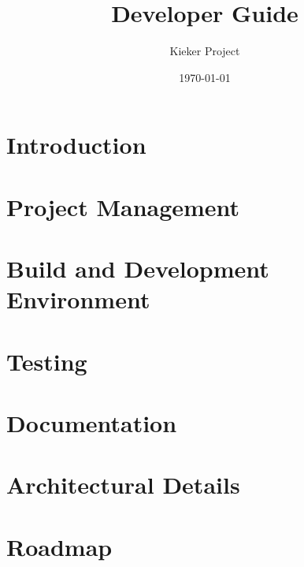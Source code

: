 \documentclass[a4paper, oneside, 11pt, pointlessnumbers, headsepline]{scrbook}
\title{%
\Huge\Kieker{} Developer Guide%
}
\author{\sffamily Kieker Project}
\date{\sffamily\today}
\begin{document}
  \maketitle
  \tableofcontents

\chapter{Introduction}


\chapter{Project Management}


\chapter{Build and Development Environment}


\chapter{Testing}


\chapter{Documentation}


\chapter{Architectural Details}


\chapter{Roadmap}

\end{document}
